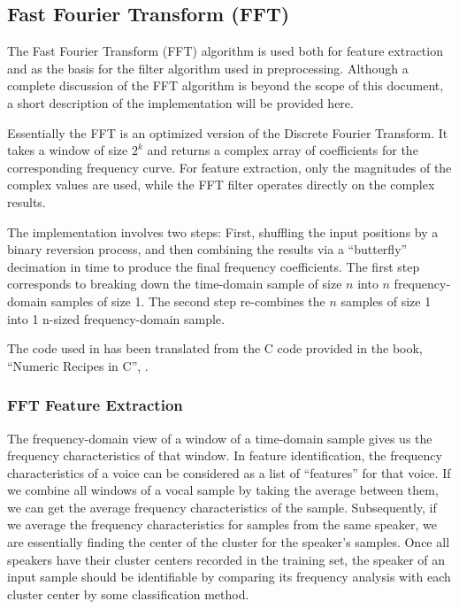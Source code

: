 \subsection{Fast Fourier Transform (FFT)}\label{sect:fft}

The Fast Fourier Transform (FFT) algorithm is used both for feature extraction and as the basis for the
filter algorithm used in preprocessing.  Although a complete discussion of the
FFT algorithm is beyond the scope of this document, a short description of the
implementation will be provided here.

Essentially the FFT is an optimized version of the Discrete Fourier Transform.
It takes a window of size $2^{k}$ and returns a complex array of coefficients
for the corresponding frequency curve.  For feature extraction, only the
magnitudes of the complex values are used, while the FFT filter operates
directly on the complex results.

The implementation involves two steps: First, shuffling the input positions by a
binary reversion process, and then combining the results via a ``butterfly''
decimation in time to produce the final frequency coefficients.
The first step corresponds to breaking down the time-domain sample of size $n$
into $n$ frequency-domain samples of size 1.  The second step re-combines the $n$
samples of size 1 into 1 n-sized frequency-domain sample.

The code used in {\marf} has been translated from the C code provided in the book,
``Numeric Recipes in C'', \cite{numericalrecipes}.

\subsubsection{FFT Feature Extraction}

The frequency-domain view of a window of a time-domain sample gives us the
frequency characteristics of that window.  In feature identification, the
frequency characteristics of a voice can be considered as a list of ``features''
for that voice.  If we combine all windows of a vocal sample by
taking the average between them, we can get the average frequency
characteristics of the sample.  Subsequently, if we average the frequency
characteristics for samples from the same speaker, we are essentially finding
the center of the cluster for the speaker's samples.  Once all speakers have
their cluster centers recorded in the training set, the speaker of an
input sample should be identifiable by comparing its frequency analysis with
each cluster center by some classification method.

